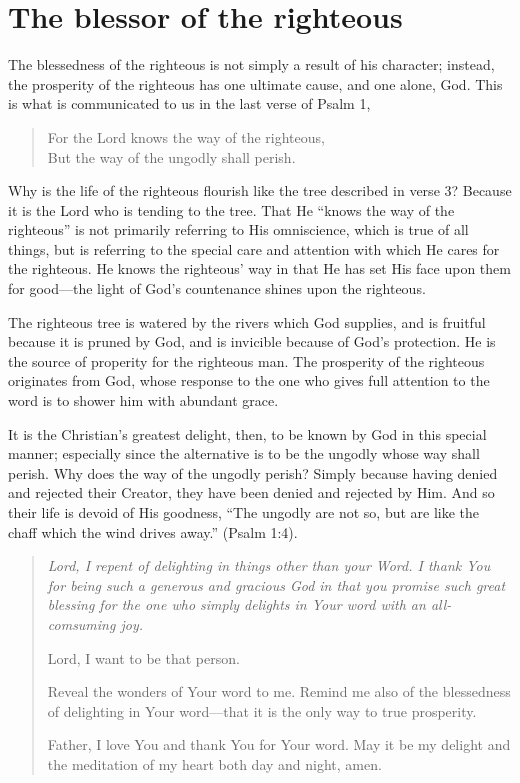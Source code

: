 \documentclass[a5paper]{book}
\newcommand{\Q}[1]{\begin{quote}#1\end{quote}}
\newcommand{\prayer}[1]{\begin{quote}{\itshape #1}\end{quote}}
\begin{document}
\section{The blessor of the righteous}
The blessedness of the righteous is not simply a result of his character;
    instead, the prosperity of the righteous has one ultimate cause, and one alone,
    God.
This is what is communicated to us in the last verse of Psalm 1,
    \Q{For the Lord knows the way of the righteous, \\
    But the way of the ungodly shall perish.}

Why is the life of the righteous flourish like the tree
    described in verse 3?
Because it is the Lord who is tending to the tree.
That He ``knows the way of the righteous'' is not primarily
    referring to His omniscience, which is true of all things,
    but is referring to the special care and attention 
    with which He cares for the righteous.
He knows the righteous' way in that He has set His face upon them for good---the
    light of God's countenance shines upon the righteous.

The righteous tree is watered by the rivers which God supplies,
    and is fruitful because it is pruned by God,
    and is invicible because of God's protection.
He is the source of properity for the righteous man.  
The prosperity of the righteous originates from God,
    whose response to the one who gives full attention to the word
    is to shower him with abundant grace.

It is the Christian's greatest delight, then,
    to be known by God in this special manner;
    especially since the alternative is to be the ungodly
    whose way shall perish.
Why does the way of the ungodly perish?
Simply because having denied and rejected their Creator,
    they have been denied and rejected by Him.
And so their life is devoid of His goodness,
    ``The ungodly are not so,
    but are like the chaff which the wind drives away.''
    (Psalm 1:4).

\prayer{
    Lord, I repent of delighting in things other than your Word.
    I thank You for being such a generous and gracious God
        in that you promise such great blessing for the one
        who simply delights in Your word
        with an all-comsuming joy. 

    Lord, I want to be that person.
    
    Reveal the wonders of Your word to me.
    Remind me also of the blessedness of delighting in Your word---that 
    it is the only way to true prosperity.
        
    Father, I love You and thank You for Your word.
    May it be my delight and the meditation of my heart both day and night, amen.}
\end{document}

